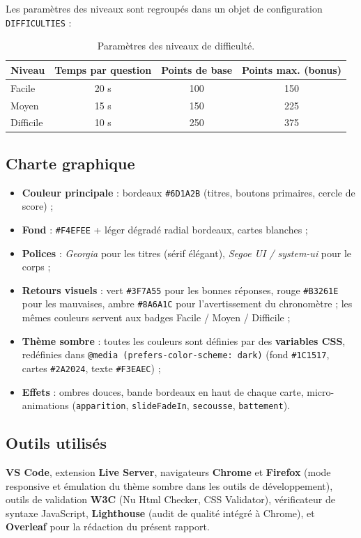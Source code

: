 \documentclass[11pt,a4paper]{article}
\begin{document}
Les paramètres des niveaux sont regroupés dans un objet de configuration
\texttt{DIFFICULTIES} :

\begin{table}[H]
\centering
\renewcommand{\arraystretch}{1.25}
\begin{tabular}{@{}lccc@{}}
\toprule
\textbf{Niveau} & \textbf{Temps par question} & \textbf{Points de base} & \textbf{Points max. (bonus)} \\
\midrule
Facile    & 20 s & 100 & 150 \\
Moyen     & 15 s & 150 & 225 \\
Difficile & 10 s & 250 & 375 \\
\bottomrule
\end{tabular}
\caption{Paramètres des niveaux de difficulté.}
\end{table}

\subsection{Charte graphique}
\begin{itemize}
  \item \textbf{Couleur principale} : bordeaux \texttt{\#6D1A2B} (titres, boutons primaires,
        cercle de score) ;
  \item \textbf{Fond} : \texttt{\#F4EFEE} + léger dégradé radial bordeaux, cartes blanches ;
  \item \textbf{Polices} : \textit{Georgia} pour les titres (sérif élégant),
        \textit{Segoe UI / system-ui} pour le corps ;
  \item \textbf{Retours visuels} : vert \texttt{\#3F7A55} pour les bonnes réponses, rouge
        \texttt{\#B3261E} pour les mauvaises, ambre \texttt{\#8A6A1C} pour l'avertissement
        du chronomètre ; les mêmes couleurs servent aux badges Facile / Moyen / Difficile ;
  \item \textbf{Thème sombre} : toutes les couleurs sont définies par des
        \textbf{variables CSS}, redéfinies dans \texttt{@media (prefers-color-scheme: dark)}
        (fond \texttt{\#1C1517}, cartes \texttt{\#2A2024}, texte \texttt{\#F3EAEC}) ;
  \item \textbf{Effets} : ombres douces, bande bordeaux en haut de chaque carte,
        micro-animations (\texttt{apparition}, \texttt{slideFadeIn}, \texttt{secousse},
        \texttt{battement}).
\end{itemize}

\subsection{Outils utilisés}
\textbf{VS Code}, extension \textbf{Live Server}, navigateurs \textbf{Chrome} et
\textbf{Firefox} (mode responsive et émulation du thème sombre dans les outils de
développement), outils de validation \textbf{W3C} (Nu Html Checker, CSS Validator),
vérificateur de syntaxe JavaScript, \textbf{Lighthouse} (audit de qualité intégré à Chrome), et \textbf{Overleaf} pour la rédaction du présent
rapport.
\end{document}
